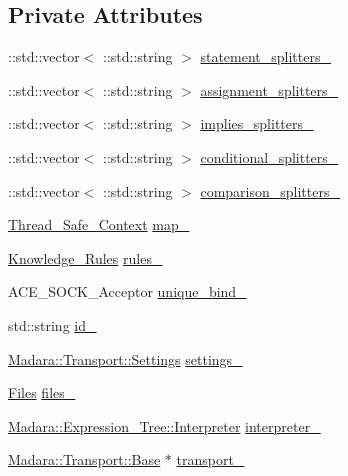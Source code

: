 \subsection*{Private Attributes}
\begin{DoxyCompactItemize}
\item 
::std::vector$<$ ::std::string $>$ \hyperlink{classMadara_1_1Knowledge__Engine_1_1Knowledge__Base__Impl_a96497fa896d6ade4c84dbf4b6262ab96}{statement\_\-splitters\_\-}
\item 
::std::vector$<$ ::std::string $>$ \hyperlink{classMadara_1_1Knowledge__Engine_1_1Knowledge__Base__Impl_aea7a634dd153091545b3f5c0c4c9eeab}{assignment\_\-splitters\_\-}
\item 
::std::vector$<$ ::std::string $>$ \hyperlink{classMadara_1_1Knowledge__Engine_1_1Knowledge__Base__Impl_a4afdcca177b3aefd4e16b4e9a90a6f81}{implies\_\-splitters\_\-}
\item 
::std::vector$<$ ::std::string $>$ \hyperlink{classMadara_1_1Knowledge__Engine_1_1Knowledge__Base__Impl_aba1605420ef07946f5336ec8f2c0a69f}{conditional\_\-splitters\_\-}
\item 
::std::vector$<$ ::std::string $>$ \hyperlink{classMadara_1_1Knowledge__Engine_1_1Knowledge__Base__Impl_a6d39ebcadcabca6ebdcacd09f557e98e}{comparison\_\-splitters\_\-}
\item 
\hyperlink{classMadara_1_1Knowledge__Engine_1_1Thread__Safe__Context}{Thread\_\-Safe\_\-Context} \hyperlink{classMadara_1_1Knowledge__Engine_1_1Knowledge__Base__Impl_a686065198ca0023bcb6271d00c7873d0}{map\_\-}
\item 
\hyperlink{namespaceMadara_a40d054dded9fdde46b83532c44c6ff96}{Knowledge\_\-Rules} \hyperlink{classMadara_1_1Knowledge__Engine_1_1Knowledge__Base__Impl_a134e1ce4a1e1a7e7611f19c55d27fb9d}{rules\_\-}
\item 
ACE\_\-SOCK\_\-Acceptor \hyperlink{classMadara_1_1Knowledge__Engine_1_1Knowledge__Base__Impl_a063f54bf5e0d35010a9e266169d16981}{unique\_\-bind\_\-}
\item 
std::string \hyperlink{classMadara_1_1Knowledge__Engine_1_1Knowledge__Base__Impl_a18712c52904d45dacf9c4a7eb3f39432}{id\_\-}
\item 
\hyperlink{classMadara_1_1Transport_1_1Settings}{Madara::Transport::Settings} \hyperlink{classMadara_1_1Knowledge__Engine_1_1Knowledge__Base__Impl_a95afcfeb28f9262b0ede5954111a706b}{settings\_\-}
\item 
\hyperlink{classMadara_1_1Knowledge__Engine_1_1Files}{Files} \hyperlink{classMadara_1_1Knowledge__Engine_1_1Knowledge__Base__Impl_aebb2bed99ac68af8ca0cd476d73ae485}{files\_\-}
\item 
\hyperlink{classMadara_1_1Expression__Tree_1_1Interpreter}{Madara::Expression\_\-Tree::Interpreter} \hyperlink{classMadara_1_1Knowledge__Engine_1_1Knowledge__Base__Impl_af30b9d9180562a750c00c97fb268b7c7}{interpreter\_\-}
\item 
\hyperlink{classMadara_1_1Transport_1_1Base}{Madara::Transport::Base} $\ast$ \hyperlink{classMadara_1_1Knowledge__Engine_1_1Knowledge__Base__Impl_a3bdc08dfe120ef9b76702575b82f24bb}{transport\_\-}
\end{DoxyCompactItemize}


